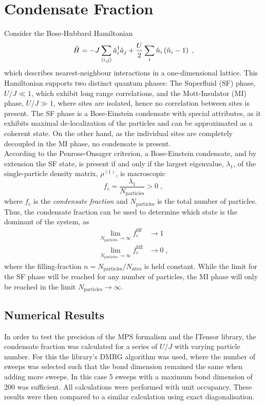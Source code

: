 \chapter{Condensate Fraction}

Consider the Bose-Hubbard Hamiltonian
\begin{equation}
	\hat{H} = -J \sum_{\braket{i,j}} \hat{a}_{i}^{\dag} \hat{a}_j + \frac{U}{2} \sum_{i} \hat{n}_i \left( \hat{n}_i -1 \right) \; , 
\end{equation}
which describes nearest-neighbour interactions in a one-dimensional lattice. This Hamiltonian supports two distinct quantum phases: The Superfluid (SF) phase, $U/J \ll 1$, which exhibit long range correlations, and the Mott-Insulator (MI) phase, $U/J \gg 1$, where sites are isolated, hence no correlation between sites is present. The SF phase is a Bose-Einstein condensate with special attributes, as it exhibits maximal de-localization of the particles and can be approximated as a coherent state. On the other hand, as the individual sites are completely decoupled in the MI phase, no condensate is present. \\
According to the Penrose-Onsager criterion, a Bose-Einstein condensate, and by extension the SF state, is present if and only if the largest eigenvalue, $\lambda_1$, of the single-particle density matrix, $\rho^{(1)}$, is macroscopic
\begin{equation}
	f_c = \frac{\lambda_1}{N_{\mathrm{particles}}} > 0 \; ,
\end{equation} 
where $f_c$ is the \textit{condensate fraction} and $N_{\mathrm{particles}}$ is the total number of particles. Thus, the condensate fraction can be used to determine which state is the dominant of the system, as
\begin{align}
	\lim_{N_{\mathrm{particles}} \to \infty} f_{c}^{\mathrm{SF}} &\to 1 \label{eq:SF_lim} \\
	\lim_{N_{\mathrm{particles}} \to \infty} f_{c}^{\mathrm{MI}} &\to 0 \; , \label{eq:MI_lim}
\end{align}
where the filling-fraction $n = N_{\mathrm{particles}}/N_{\mathrm{sites}}$ is held constant. While the limit for the SF phase will be reached for any number of particles, the MI phase will only be reached in the limit $N_{\mathrm{particles}} \to \infty$.

\section{Numerical Results}
In order to test the precision of the MPS formalism and the ITensor library, the condensate fraction was calculated for a series of $U/J$ with varying particle number. For this the library's DMRG algorithm was used, where the number of sweeps was selected such that the bond dimension remained the same when adding more sweeps. In this case 5 sweeps with a maximum bond dimension of 200 was sufficient. All calculations were performed with unit occupancy. These results were then compared to a similar calculation using exact diagonalisation.

